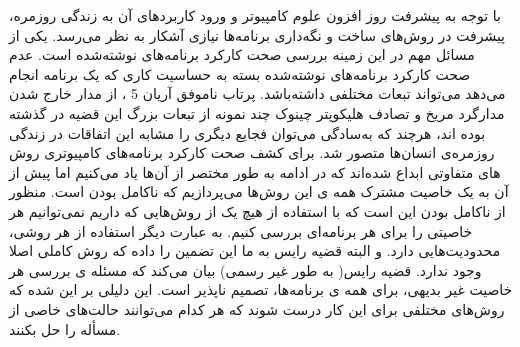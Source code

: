 \documentclass[12pt]{report}
\begin{document}
با توجه به پیشرفت روز‌ افزون علوم کامپیوتر و ورود کاربرد‌های آن به زندگی روزمره، پیشرفت در روش‌های ساخت و نگه‌داری برنامه‌ها نیازی آشکار به نظر می‌رسد. یکی از مسائل مهم در این زمینه بررسی صحت کارکرد برنامه‌های نوشته‌شده است. عدم صحت کارکرد برنامه‌های نوشته‌شده بسته به حساسیت کاری که یک برنامه انجام می‌دهد می‌تواند تبعات مختلفی داشته‌باشد. پرتاب ناموفق آریان 5\cite{ariane}  ، از مدار خارج شدن مدار‌گرد مریخ \cite{orbiter} و  تصادف هلیکوپتر چینوک \cite{chinook} چند نمونه از تبعات بزرگ این قضیه در گذشته بوده اند، هرچند که به‌سادگی می‌توان فجایع دیگری را مشابه این اتفاقات در زندگی روزمره‌ی انسان‌ها متصور شد.
برای کشف صحت کارکرد برنامه‌های کامپیوتری روش های متفاوتی ابداع شده‌اند که در ادامه به طور مختصر از آن‌ها یاد می‌کنیم اما پیش از آن به یک خاصیت مشترک همه ی این روش‌ها می‌پردازیم که ناکامل بودن است. منظور از ناکامل بودن این است که با استفاده از هیچ یک از روش‌هایی که داریم نمی‌توانیم هر خاصیتی را برای هر برنامه‌ای بررسی کنیم. به عبارت دیگر استفاده از هر روشی، محدودیت‌هایی دارد. و البته قضیه رایس  \cite{rice} به ما این تضمین را داده که روش کاملی اصلا وجود ندارد. قضیه رایس( به طور غیر رسمی) بیان می‌کند که مسئله ی بررسی هر خاصیت غیر بدیهی، برای همه ی برنامه‌ها، تصمیم ناپذیر است. این دلیلی بر این شده که روش‌های مختلفی برای این کار درست شوند که هر کدام می‌توانند حالت‌های خاصی از مسأله را حل بکنند.\\
\end{document}
